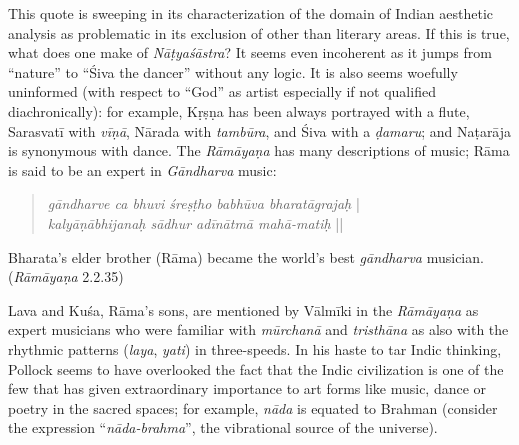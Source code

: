 This quote is sweeping in its characterization of the domain of Indian aesthetic analysis as problematic in its exclusion of other than literary areas. If this is true, what does one make of \textsl{Nāṭyaśāstra}? It seems even incoherent as it jumps from “nature” to “Śiva the dancer” without any logic. It is also seems woefully uninformed (with respect to “God” as artist especially if not qualified diachronically): for example, Kṛṣṇa has been always portrayed with a flute, Sarasvatī with \textsl{vīṇā}, Nārada with \textsl{tambūra}, and Śiva with a \textsl{ḍamaru}; and Naṭarāja is synonymous with dance. The \textsl{Rāmāyaṇa} has many descriptions of music; Rāma is said to be an expert in \textsl{Gāndharva} music:

\begin{quote}
\textsl{gāndharve ca bhuvi śreṣṭho babhūva bharatāgrajaḥ} |\\
\textsl{kalyāṇābhijanaḥ sādhur adīnātmā mahā-matiḥ} ||
\end{quote}

\begin{myquote}
Bharata’s elder brother (Rāma) became the world’s best \textsl{gāndharva} musician. 
\hfill(\textsl{Rāmāyaṇa} 2.2.35)
\end{myquote}

\newpage

Lava and Kuśa, Rāma’s sons, are mentioned by Vālmīki in the \textsl{Rāmāyaṇa} as expert musicians who were familiar with \textsl{mūrchanā} and \textsl{tristhāna} as also with the rhythmic patterns (\textsl{laya}, \textsl{yati}) in three-speeds.  In his haste to tar Indic thinking, Pollock seems to have overlooked the fact that the Indic civilization is one of the few that has given extraordinary importance to art forms like music, dance or poetry in the sacred spaces; for example, \textsl{nāda} is equated to Brahman (consider the expression ``\textsl{nāda-brahma}'', the vibrational source of the universe).\\[-20pt]

